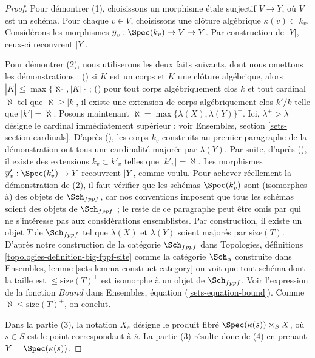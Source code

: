\begin{proof}
Pour démontrer (1), choisissons un morphisme étale surjectif $V \to Y$, où
$V$ est un schéma. Pour chaque $v \in V$, choisissons une clôture algébrique
$\kappa(v) \subset k_v$. Considérons les morphismes
$\overline{y}_v : \Spec(k_v) \to V \to Y$.
Par construction de $|Y|$, ceux-ci recouvrent $|Y|$.

\medskip\noindent
Pour démontrer (2), nous utiliserons les deux faits suivants, dont nous omettons les démonstrations :
() si $K$ est un corps et $\overline{K}$ une clôture algébrique, alors
$|\overline{K}| \leq \max\{\aleph_0, |K|\}$ ;
() pour tout corps algébriquement clos $k$ et tout cardinal
$\aleph$ tel que $\aleph \geq |k|$, il existe une extension de corps
algébriquement clos $k'/k$ telle que $|k'| = \aleph$.
Posons maintenant $\aleph = \max\{\lambda(X), \lambda(Y)\}^+$.
Ici, $\lambda^+ > \lambda$ désigne le cardinal immédiatement supérieur ; voir
Ensembles, section \ref{sets-section-cardinals}.
D'après (),
les corps $k_v$ construits au premier paragraphe
de la démonstration ont tous une cardinalité majorée par $\lambda(Y)$. Par suite,
d'après (), il existe des extensions $k_v \subset k'_v$ telles que
$|k'_v| = \aleph$. Les morphismes
$\overline{y}'_v : \Spec(k'_v) \to Y$ recouvrent $|Y|$, comme voulu.
Pour achever réellement la démonstration de (2), il faut vérifier que les schémas
$\Spec(k'_v)$ sont (isomorphes à) des objets de $\Sch_{fppf}$,
car nos conventions imposent que tous les schémas soient des objets de
$\Sch_{fppf}$ ; le reste de ce paragraphe peut être omis par
qui ne s'intéresse pas aux considérations ensemblistes. Par
construction, il existe un objet $T$ de $\Sch_{fppf}$ tel que
$\lambda(X)$ et $\lambda(Y)$ soient majorés par $\text{size}(T)$.
D'après notre construction de la catégorie $\Sch_{fppf}$ dans
Topologies, définitions \ref{topologies-definition-big-fppf-site}
comme la catégorie $\Sch_\alpha$ construite dans
Ensembles, lemme \ref{sets-lemma-construct-category}
on voit que tout schéma dont la taille est $\leq \text{size}(T)^+$
est isomorphe à un objet de $\Sch_{fppf}$. Voir
l'expression de la fonction $Bound$ dans
Ensembles, équation (\ref{sets-equation-bound}).
Comme $\aleph \leq \text{size}(T)^+$, on conclut.

\medskip\noindent
Dans la partie (3), la notation $X_s$ désigne
le produit fibré $\Spec(\kappa(s)) \times_S X$, où $s \in S$
est le point correspondant à $\overline{s}$. La partie (3) résulte donc
de (4) en prenant $Y = \Spec(\kappa(s))$.


\end{proof}
